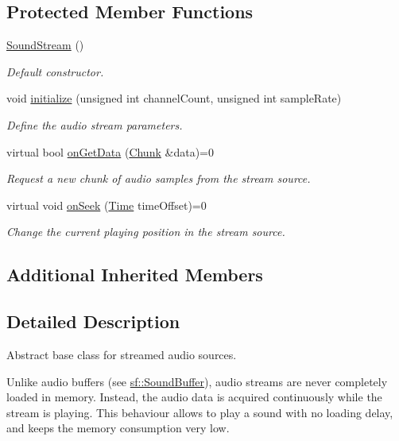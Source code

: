 \subsection*{Protected Member Functions}
\begin{DoxyCompactItemize}
\item 
\hyperlink{classsf_1_1SoundStream_a769d08f4c3c6b4340ef3a838329d2e5c}{Sound\-Stream} ()
\begin{DoxyCompactList}\small\item\em Default constructor. \end{DoxyCompactList}\item 
void \hyperlink{classsf_1_1SoundStream_a9c351711198ee1aa77c2fefd3ced4d2c}{initialize} (unsigned int channel\-Count, unsigned int sample\-Rate)
\begin{DoxyCompactList}\small\item\em Define the audio stream parameters. \end{DoxyCompactList}\item 
virtual bool \hyperlink{classsf_1_1SoundStream_a968ec024a6e45490962c8a1121cb7c5f}{on\-Get\-Data} (\hyperlink{structsf_1_1SoundStream_1_1Chunk}{Chunk} \&data)=0
\begin{DoxyCompactList}\small\item\em Request a new chunk of audio samples from the stream source. \end{DoxyCompactList}\item 
virtual void \hyperlink{classsf_1_1SoundStream_a907036dd2ca7d3af5ead316e54b75997}{on\-Seek} (\hyperlink{classsf_1_1Time}{Time} time\-Offset)=0
\begin{DoxyCompactList}\small\item\em Change the current playing position in the stream source. \end{DoxyCompactList}\end{DoxyCompactItemize}
\subsection*{Additional Inherited Members}


\subsection{Detailed Description}
Abstract base class for streamed audio sources. 

Unlike audio buffers (see \hyperlink{classsf_1_1SoundBuffer}{sf\-::\-Sound\-Buffer}), audio streams are never completely loaded in memory. Instead, the audio data is acquired continuously while the stream is playing. This behaviour allows to play a sound with no loading delay, and keeps the memory consumption very low.

